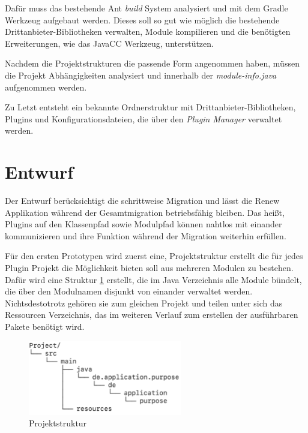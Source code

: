 Dafür muss das bestehende Ant \textit{build} System analysiert und mit dem Gradle Werkzeug aufgebaut werden. Dieses soll so gut wie möglich die bestehende Drittanbieter-Bibliotheken verwalten, Module kompilieren und die benötigten Erweiterungen, wie das JavaCC Werkzeug, unterstützen.  
\bigbreak

Nachdem die Projektstrukturen die passende Form angenommen haben, müssen die Projekt Abhängigkeiten analysiert und innerhalb der \textit{module-info.java} aufgenommen werden. 
\bigbreak

Zu Letzt entsteht ein bekannte Ordnerstruktur mit Drittanbieter-Bibliotheken, Plugins und Konfigurationsdateien, die  über den \textit{Plugin Manager} verwaltet werden. 

\section{Entwurf}
Der Entwurf berücksichtigt die schrittweise Migration und lässt die Renew Applikation während der Gesamtmigration betriebsfähig bleiben. Das heißt, Plugins auf den Klassenpfad sowie Modulpfad können nahtlos mit einander kommunizieren und ihre Funktion während der Migration weiterhin erfüllen.   
\bigbreak

Für den ersten Prototypen wird zuerst eine, Projektstruktur erstellt die für jedes Plugin Projekt die Möglichkeit bieten soll aus mehreren Modulen zu bestehen. Dafür wird eine Struktur \ref{fig:projektstruktur} erstellt, die im Java Verzeichnis alle Module bündelt, die über den Modulnamen disjunkt von einander verwaltet werden. Nichtsdestotrotz gehören sie zum gleichen Projekt und teilen unter sich das Ressourcen Verzeichnis, das im weiteren Verlauf zum erstellen der ausführbaren Pakete benötigt wird.

\begin{figure}[h!]
  \centering
  \includegraphics[width=0.6\textwidth]{material/images/project-structure.png}
  \caption{Projektstruktur}
  \label{fig:projektstruktur}
\end{figure}
       
